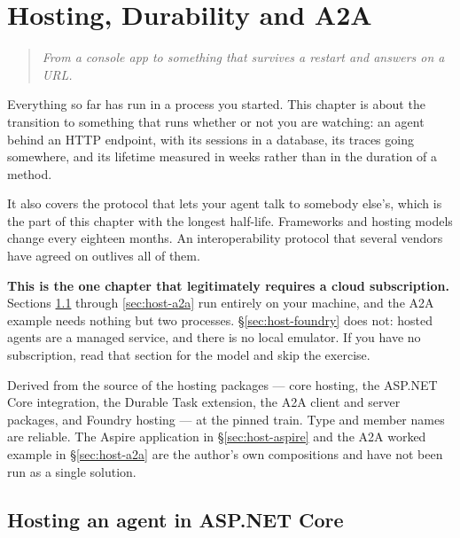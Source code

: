 \chapter{Hosting, Durability and A2A}
\label{ch:hosting}

\begin{quote}\itshape
From a console app to something that survives a restart and answers on a URL.
\end{quote}

\noindent
Everything so far has run in a process you started. This chapter is about the
transition to something that runs whether or not you are watching: an agent
behind an HTTP endpoint, with its sessions in a database, its traces going
somewhere, and its lifetime measured in weeks rather than in the duration of a
 method.

It also covers the protocol that lets your agent talk to somebody else's, which
is the part of this chapter with the longest half-life. Frameworks and hosting
models change every eighteen months. An interoperability protocol that several
vendors have agreed on outlives all of them.

\begin{note}
\textbf{This is the one chapter that legitimately requires a cloud
subscription.} Sections \ref{sec:host-aspnet} through \ref{sec:host-a2a} run
entirely on your machine, and the A2A example needs nothing but two processes.
\S\ref{sec:host-foundry} does not: hosted agents are a managed service, and there
is no local emulator. If you have no subscription, read that section for the
model and skip the exercise.
\end{note}

\begin{verifybox}
Derived from the source of the hosting packages --- core hosting, the ASP.NET
Core integration, the Durable Task extension, the A2A client and server packages,
and Foundry hosting --- at the pinned train. Type and member names are reliable.
The Aspire application in \S\ref{sec:host-aspire} and the A2A worked example in
\S\ref{sec:host-a2a} are the author's own compositions and have not been run as a
single solution.
\end{verifybox}

\section{Hosting an agent in ASP.NET Core}
\label{sec:host-aspnet}

